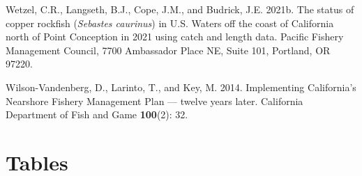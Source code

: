 \documentclass[11pt,
  english,
  letterpaper,
]{article}
\newlength{\cslhangindent}
\newenvironment{CSLReferences}[2] %
 {%
  \setlength{\parindent}{0pt}
  \ifodd #1 \everypar{\setlength{\hangindent}{\cslhangindent}}\ignorespaces\fi
  \ifnum #2 > 0
  \setlength{\parskip}{#2\baselineskip}
  \fi
 }%
 {}
\begin{document}
\begin{CSLReferences}{1}{0}
\leavevmode{}%
Wetzel, C.R., Langseth, B.J., Cope, J.M., and Budrick, J.E. 2021b. The status of copper rockfish (\emph{{Sebastes} caurinus}) in {U}.{S}. Waters off the coast of {California} north of {Point} {Conception} in 2021 using catch and length data. Pacific Fishery Management Council, 7700 Ambassador Place NE, Suite 101, Portland, OR 97220.

\leavevmode{}%
Wilson-Vandenberg, D., Larinto, T., and Key, M. 2014. Implementing {California}'s {Nearshore} {Fishery} {Management} {Plan} --- twelve years later. California Department of Fish and Game \textbf{100}(2): 32.

\end{CSLReferences}

\clearpage

\hypertarget{tables}{%
\section{Tables}\label{tables}}

\begingroup\fontsize{10}{12}\selectfont
\begingroup\fontsize{10}{12}\selectfont
\end{document}

